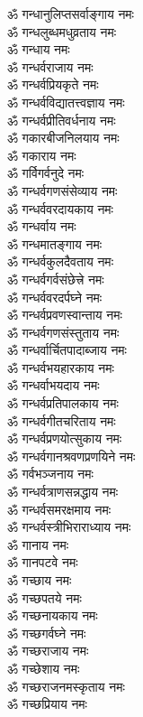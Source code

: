 \begin{multicols}{2}
\begin{flushleft}
ॐ गन्धानुलिप्तसर्वाङ्गाय नमः\\
ॐ गन्धलुब्धमधुव्रताय नमः\hfill{}\\
ॐ गन्धाय नमः\\
ॐ गन्धर्वराजाय नमः\\
ॐ गन्धर्वप्रियकृते नमः\\
ॐ गन्धर्वविद्यातत्त्वज्ञाय नमः\\
ॐ गन्धर्वप्रीतिवर्धनाय नमः\\
ॐ गकारबीजनिलयाय नमः\\
ॐ गकाराय नमः\\
ॐ गर्विगर्वनुदे नमः\\
ॐ गन्धर्वगणसंसेव्याय नमः\\
ॐ गन्धर्ववरदायकाय नमः\hfill{}\\
ॐ गन्धर्वाय नमः\\
ॐ गन्धमातङ्गाय नमः\\
ॐ गन्धर्वकुलदैवताय नमः\\
ॐ गन्धर्वगर्वसंछेत्त्रे नमः\\
ॐ गन्धर्ववरदर्पघ्ने नमः\\
ॐ गन्धर्वप्रवणस्वान्ताय नमः\\
ॐ गन्धर्वगणसंस्तुताय नमः\\
ॐ गन्धर्वार्चितपादाब्जाय नमः\\
ॐ गन्धर्वभयहारकाय नमः\\
ॐ गन्धर्वाभयदाय नमः\hfill{}\\
ॐ गन्धर्वप्रतिपालकाय नमः\\
ॐ गन्धर्वगीतचरिताय नमः\\
ॐ गन्धर्वप्रणयोत्सुकाय नमः\\
ॐ गन्धर्वगानश्रवणप्रणयिने नमः\\
ॐ गर्वभञ्जनाय नमः\\
ॐ गन्धर्वत्राणसन्नद्धाय नमः\\
ॐ गन्धर्वसमरक्षमाय नमः\\
ॐ गन्धर्वस्त्रीभिराराध्याय नमः\\
ॐ गानाय नमः\\
ॐ गानपटवे नमः\hfill{}\\
ॐ गच्छाय नमः\\
ॐ गच्छपतये नमः\\
ॐ गच्छनायकाय नमः\\
ॐ गच्छगर्वघ्ने नमः\\
ॐ गच्छराजाय नमः\\
ॐ गच्छेशाय नमः\\
ॐ गच्छराजनमस्कृताय नमः\\
ॐ गच्छप्रियाय नमः\\

\end{flushleft}
\end{multicols}
